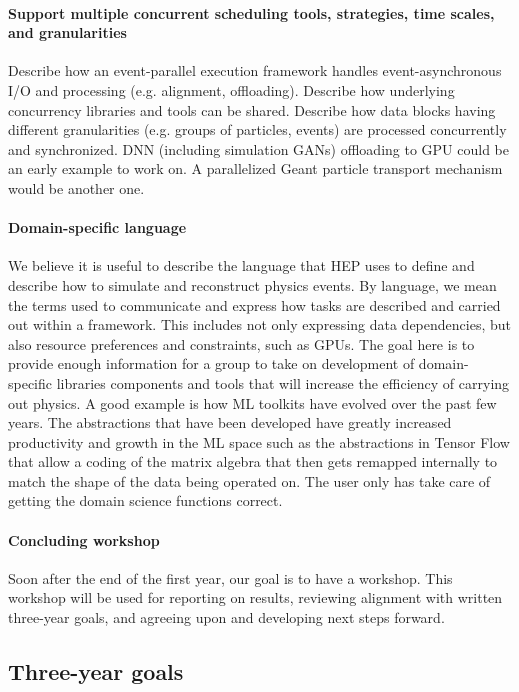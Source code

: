 \documentclass[12pt,a4paper]{article}
\begin{document}
\paragraph{Support multiple concurrent scheduling tools, strategies,
  time scales, and granularities} Describe how an event-parallel
execution framework handles event-asynchronous I/O and processing
(e.g. alignment, offloading). Describe how underlying concurrency
libraries and tools can be shared. Describe how data blocks having
different granularities (e.g.  groups of particles, events) are
processed concurrently and synchronized. DNN (including simulation
GANs) offloading to GPU could be an early example to work on. A
parallelized Geant particle transport mechanism would be another one.

\paragraph{Domain-specific language} We believe it is useful to
describe the language that HEP uses to define and describe how to
simulate and reconstruct physics events. By language, we mean the
terms used to communicate and express how tasks are described and
carried out within a framework. This includes not only expressing data
dependencies, but also resource preferences and constraints, such as
GPUs. The goal here is to provide enough information for a group to
take on development of domain-specific libraries components and tools
that will increase the efficiency of carrying out physics. A good example
is how ML toolkits have evolved over the past few years. The
abstractions that have been developed have greatly increased productivity
and growth in the ML space such as the abstractions in Tensor Flow that
allow a coding of the matrix algebra that then gets remapped internally to
match the shape of the data being operated on.  The user only has take care
of getting the domain science functions correct.

\paragraph{Concluding workshop} Soon after the end of the first year,
our goal is to have a workshop. This workshop will be used for
reporting on results, reviewing alignment with written three-year
goals, and agreeing upon and developing next steps forward.

\subsection{Three-year goals}
\label{sec:three-year-goals}
\end{document}
